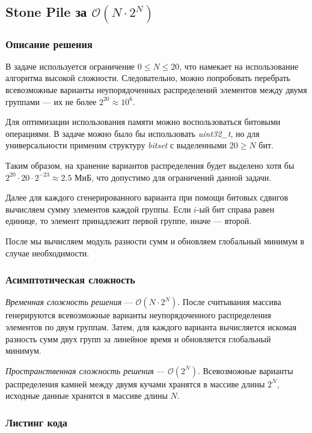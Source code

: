 \subsection{Stone Pile за $\mathcal{O}(N\cdot 2^N)$}

\subsubsection{Описание решения}

В задаче используется ограничение \( 0\leq N\leq 20 \), что намекает на использование алгоритма высокой сложности. Следовательно, можно попробовать перебрать всевозможные варианты неупорядоченных распределений элементов между двумя группами --- их не более \( 2^{20}\approx 10^6 \).

Для оптимизации использования памяти можно воспользоваться битовыми операциями. В задаче можно было бы использовать \textit{uint32\_t}, но для универсальности применим структуру \textit{bitset} с выделенными \( 20\geq N \) бит.  

Таким образом, на хранение вариантов распределения будет выделено хотя бы \( 2^{20}\cdot 20\cdot 2^{-23}\approx 2.5 \) МиБ, что допустимо для ограничений данной задачи.

Далее для каждого сгенерированного варианта при помощи битовых сдвигов вычисляем сумму элементов каждой группы. Если \( i \)-ый бит справа равен единице, то элемент принадлежит первой группе, иначе --- второй.

После мы вычисляем модуль разности сумм и обновляем глобальный минимум в случае необходимости.

\subsubsection{Асимптотическая сложность}

\textit{Временная сложность решения} --- \( \mathcal{O}(N\cdot 2^N) \). После считывания массива генерируются всевозможные варианты неупорядоченного распределения элементов по двум группам. Затем, для каждого варианта вычисляется искомая разность сумм двух групп за линейное время и обновляется глобальный минимум.

\textit{Пространственная сложность решения} --- \( \mathcal{O}(2^N) \). Всевозможные варианты распределения камней между двумя кучами хранятся в массиве длины \( 2^N \), исходные данные хранятся в массиве длины \( N \). 

\subsubsection{Листинг кода}

